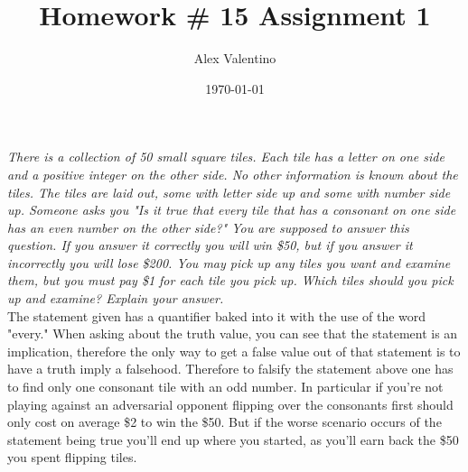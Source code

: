 \documentclass[12pt, letterpaper]{article}
\date{\today}
\title{Homework \# 15 }
\author{Alex Valentino}
\title{Assignment 1}
\begin{document}
	\textit{There is a collection of 50 small square tiles. Each tile has a letter on one side and a positive
integer on the other side. No other information is known about the tiles. The tiles are laid
out, some with letter side up and some with number side up. Someone asks you "Is it true
that every tile that has a consonant on one side has an even number on the other side?" You
are supposed to answer this question. If you answer it correctly you will win \$50, but if you
answer it incorrectly you will lose \$200. You may pick up any tiles you want and examine
them, but you must pay \$1 for each tile you pick up. Which tiles should you pick up and
examine? Explain your answer.}\\

	The statement given has a quantifier baked into it with the use of the word "every."  When asking about the truth value, you can see that the statement is an implication, therefore the only way to get a false value out of that statement is to have a truth imply a falsehood.  Therefore to falsify the statement above one has to find only one consonant tile with an odd number.  In particular if you're not playing against an adversarial opponent flipping over the consonants first should only cost on average \$2 to win the \$50.   But if the worse scenario occurs of the statement being true you'll end up where you started, as you'll earn back the \$50 you spent flipping tiles.     
\end{document}
